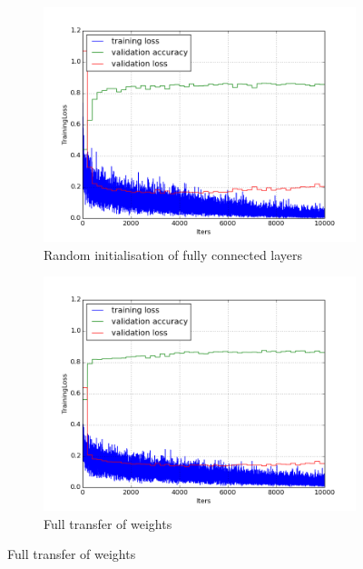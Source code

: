 \documentclass[a4paper,11pt]{article}
\begin{document}
\begin{figure}
    \centering
    \begin{minipage}[b]{\textwidth}
      \begin{subfigure}{.5\textwidth} 
        \centering
        \includegraphics[scale=0.4]{images/plot_clampdet_none_reinit.png}
        \caption{Random initialisation of fully connected layers}\label{fig:2a}
      \end{subfigure}%
      \begin{subfigure}{.5\textwidth} 
        \centering
        \includegraphics[scale=0.4]{images/plot_clampdet_none-10k.png}
        \caption{Full transfer of weights}\label{fig:2b}
      \end{subfigure} \par \vspace*{20pt} %
    \end{minipage}%
    \label{f39}
\end{figure}
\end{document}
